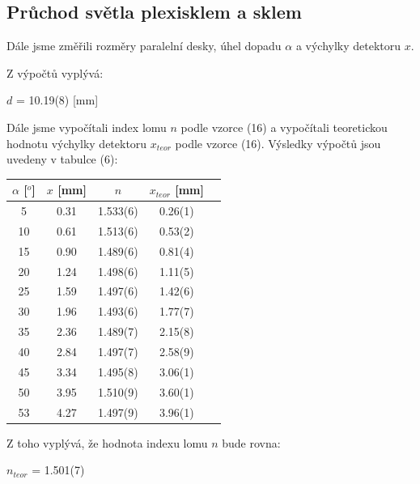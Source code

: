 \documentclass[a4paper,11pt]{article}
\begin{document}
\begin{minipage}[t]{0.5\textwidth}
            \subsection{Průchod světla plexisklem a sklem}
                Dále jsme změřili rozměry paralelní desky, úhel dopadu $\alpha$ a výchylky detektoru $x$.
                \par Z výpočtů vyplývá: 
                \begin{center}
                    $d$ = 10.19(8) [mm]
                \end{center}
                \par Dále jsme vypočítali index lomu $n$ podle vzorce (16) a vypočítali teoretickou hodnotu výchylky detektoru $x_{teor}$ podle vzorce (16). Výsledky výpočtů jsou uvedeny v tabulce (6):
                \par \centering
                \vspace{10pt}
                \begin{tabular}{|c|c|c|c|c}
                    \hline
                    $\alpha$ [$^o$] & $x$ [mm] &  $n$  & $x_{teor}$ [mm]\\
                    \hline
                    5  & 0.31  & 1.533(6)  & 0.26(1) \\
                    \hline
                    10 & 0.61  & 1.513(6)  & 0.53(2) \\
                    \hline
                    15 & 0.90  & 1.489(6)  & 0.81(4) \\
                    \hline
                    20 & 1.24  & 1.498(6)  & 1.11(5) \\
                    \hline
                    25 & 1.59  & 1.497(6)  & 1.42(6) \\
                    \hline
                    30 & 1.96  & 1.493(6)  & 1.77(7) \\
                    \hline
                    35 & 2.36  & 1.489(7)  & 2.15(8) \\
                    \hline
                    40 & 2.84  & 1.497(7)  & 2.58(9) \\
                    \hline
                    45 & 3.34  & 1.495(8)  & 3.06(1) \\
                    \hline
                    50 & 3.95  & 1.510(9)  & 3.60(1) \\
                    \hline
                    53 & 4.27  & 1.497(9)  & 3.96(1) \\
                    \hline
                \end{tabular}
                \captionsetup{justification=centering, font=footnotesize}
                \vspace{10pt}
                \raggedright
                \par Z toho vyplývá, že hodnota indexu lomu $n$ bude rovna:
                \begin{center}
                    $n_{teor}$ = 1.501(7)
                \end{center}
    \end{minipage}
\end{document}
